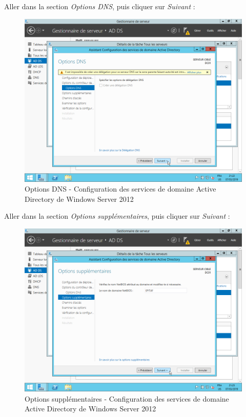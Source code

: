 \newpage
Aller dans la section \textit{Options DNS}, puis cliquer sur \textit{Suivant} :
\begin{figure}[h!]
    \begin{center}
        \includegraphics[scale=0.6]{WS2012_Screenshots/60.png}
        \caption{Options DNS - Configuration des services de domaine Active Directory de Windows Server 2012}
        \label{WS2012_Screenshots/60}
    \end{center}
\end{figure}
\FloatBarrier

\newpage
Aller dans la section \textit{Options supplémentaires}, puis cliquer sur \textit{Suivant} :
\begin{figure}[h!]
    \begin{center}
        \includegraphics[scale=0.6]{WS2012_Screenshots/61.png}
        \caption{Options supplémentaires - Configuration des services de domaine Active Directory de Windows Server 2012}
        \label{WS2012_Screenshots/61}
    \end{center}
\end{figure}
\FloatBarrier

